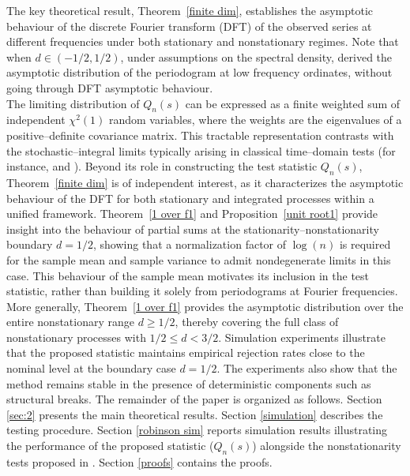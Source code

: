 \documentclass[12pt]{article}
\numberwithin{equation}{section}
\begin{document}
The key theoretical result, Theorem~\ref{finite dim}, establishes the asymptotic behaviour of the discrete Fourier transform (DFT)  of the observed series at different frequencies under both stationary and nonstationary regimes.
Note that when \(d\in(-1/2,1/2)\), under assumptions on the spectral density, \cite{MR1307342} derived the asymptotic distribution of the periodogram at low frequency ordinates, without going through DFT asymptotic behaviour.\\
 The limiting distribution of $Q_n(s)$ can be expressed as a finite weighted sum of independent $\chi^2(1)$ random variables, where the weights are the eigenvalues of a positive--definite covariance matrix. This tractable representation contrasts with the stochastic--integral limits typically arising in classical time--domain tests (for instance, \cite{DickeyFuller1979} and  \cite{MR2328526}).
Beyond its role in constructing the test statistic $Q_n(s)$, Theorem~\ref{finite dim} is of independent interest, as it characterizes the asymptotic behaviour of the DFT for both stationary and integrated processes within a unified framework.
Theorem~\ref{1 over f1} and Proposition~\ref{unit root1} provide insight into the behaviour of partial sums at the stationarity--nonstationarity boundary $d=1/2$, showing that a normalization factor of $\log(n)$ is required for the sample mean and sample variance to admit nondegenerate limits in this case. This behaviour of the sample mean motivates its inclusion in the test statistic, rather than building it solely from periodograms at Fourier frequencies.
More generally, Theorem~\ref{1 over f1} provides the asymptotic distribution over the entire nonstationary range $d \ge 1/2$, thereby covering the full class of nonstationary processes with $1/2\le d<3/2$.
Simulation experiments illustrate that the proposed statistic maintains empirical rejection rates close to the nominal level at the boundary case \(d=1/2\). The experiments also show that the method remains stable in the presence of deterministic components such as structural breaks.
The remainder of the paper is organized as follows. Section \ref{sec:2} presents the main theoretical results. Section \ref{simulation} describes the testing procedure. Section \ref{robinson sim} reports simulation results illustrating the performance of the proposed statistic ($Q_n(s)$) alongside the nonstationarity tests proposed in \cite{Robinson}.
Section \ref{proofs} contains the proofs.
\end{document}
